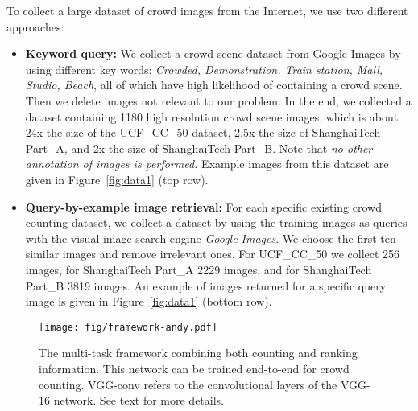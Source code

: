 \documentclass[10pt,twocolumn,letterpaper]{article}
\begin{document}
To collect a large dataset of crowd images from the Internet, we use
two different approaches:
\begin{itemize}
\item \textbf{Keyword query:} We collect a crowd scene dataset from
  Google Images by using different key words: \emph{Crowded,
    Demonstration, Train station, Mall, Studio, Beach}, all of which
  have high likelihood of containing a crowd scene. Then we delete
  images not relevant to our problem. In the end, we collected a
  dataset containing 1180 high resolution crowd scene images, which is
  about 24x the size of the UCF\_CC\_50 dataset, 2.5x the size of
  ShanghaiTech Part\_A, and 2x the size of ShanghaiTech Part\_B. Note
  that \emph{no other annotation of images is performed.} Example
  images from this dataset are given in Figure~\ref{fig:data1} (top
  row).

\item \textbf{Query-by-example image retrieval:} For each specific
  existing crowd counting dataset, we collect a dataset by using the
  training images as queries with the visual image search engine
  \emph{Google Images}. We choose the first ten similar images and
  remove irrelevant ones. For UCF\_CC\_50 we collect 256 images, for
  ShanghaiTech Part\_A 2229 images, and for ShanghaiTech Part\_B 3819
  images.  An example of images returned for a specific query image is
  given in Figure~\ref{fig:data1} (bottom row).
\end{itemize}


\begin{figure*}[tpb]
\centering
  \texttt{[image: fig/framework-andy.pdf]}
  \caption{The multi-task framework combining both counting and
    ranking information. This network can be trained end-to-end for
    crowd counting. VGG-conv refers to the convolutional layers of the VGG-16 network. See text for more details.}
  \label{fig:framework}
\end{figure*}
\end{document}
